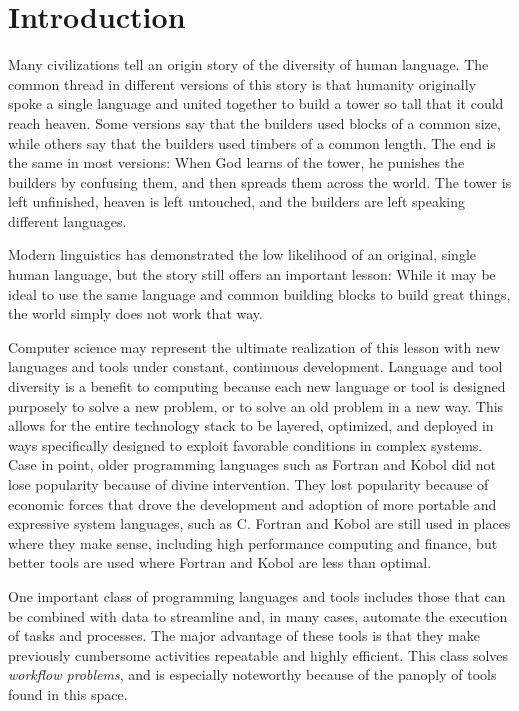 \chapter{Introduction} \label{ch:introduction}

Many civilizations tell an origin story of the diversity of human language. The
common thread in different versions of this story is that humanity
originally spoke a single language and united together to build a tower so tall
that it could reach heaven. Some versions say that the builders used blocks of
a common size, while others say that the builders used timbers of a common
length. The end is the same in most versions: When God learns of the
tower, he punishes the builders by confusing them, and then spreads them across
the world. The tower is left unfinished, heaven is left untouched, and the
builders are left speaking different languages.

Modern linguistics has demonstrated the low likelihood of an original, single
human language, but the story still offers an important lesson: While it may be
ideal to use the same language and common building blocks to build great
things, the world simply does not work that way.

Computer science may represent the ultimate realization of this lesson with new
languages and tools under constant, continuous development. Language and tool
diversity is a benefit to computing because each new language or tool is
designed purposely to solve a new problem, or to solve an old problem in a new
way. This allows for the entire technology stack to  be layered, optimized,
and deployed in ways specifically designed to exploit favorable conditions in
complex systems. Case in point, older programming languages such as Fortran and
Kobol did not lose popularity because of divine intervention. They lost
popularity because of economic forces that drove the development and adoption
of more portable and expressive system languages, such as C. Fortran and Kobol
are still used in places where they make sense, including high performance
computing and finance, but better tools are used where Fortran and Kobol are
less than optimal.

One important class of programming languages and tools includes those that
can be combined with data to streamline and, in many cases, automate the execution
of tasks and processes. The major advantage of these tools is that they make
previously cumbersome activities repeatable and highly efficient. This class solves
\textit{workflow problems}, and is especially noteworthy because of the panoply
of tools found in this space.

